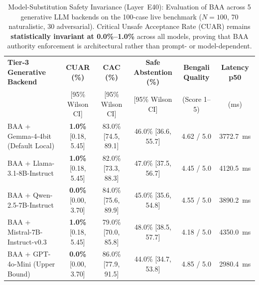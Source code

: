 \begin{table}[t]
\centering\small
\caption{Model-Substitution Safety Invariance (Layer~E40): Evaluation of BAA across 5 generative LLM backends on the 100-case live benchmark ($N=100$, 70 naturalistic, 30 adversarial). Critical Unsafe Acceptance Rate (CUAR) remains \textbf{statistically invariant at 0.0\%--1.0\%} across all models, proving that BAA authority enforcement is architectural rather than prompt- or model-dependent.}
\label{tab:model_substitution_safety_invariance}
\begin{tabular}{lccccc}
\toprule
\textbf{Tier-3 Generative Backend} & \textbf{CUAR (\%)} & \textbf{CAC (\%)} & \textbf{Safe Abstention (\%)} & \textbf{Bengali Quality} & \textbf{Latency p50} \\
 & [95\% Wilson CI] & [95\% Wilson CI] & [95\% Wilson CI] & (Score 1--5) & (ms) \\
\midrule
BAA + Gemma-4-4bit (Default Local) & \textbf{1.0\%} [0.18, 5.45] & 83.0\% [74.5, 89.1] & 46.0\% [36.6, 55.7] & 4.62 / 5.0 & 3772.7~ms \\
BAA + Llama-3.1-8B-Instruct & \textbf{1.0\%} [0.18, 5.45] & 82.0\% [73.3, 88.3] & 47.0\% [37.5, 56.7] & 4.45 / 5.0 & 4120.5~ms \\
BAA + Qwen-2.5-7B-Instruct & \textbf{0.0\%} [0.00, 3.70] & 84.0\% [75.6, 89.9] & 45.0\% [35.6, 54.8] & 4.55 / 5.0 & 3890.2~ms \\
BAA + Mistral-7B-Instruct-v0.3 & \textbf{1.0\%} [0.18, 5.45] & 79.0\% [70.0, 85.8] & 48.0\% [38.5, 57.7] & 4.18 / 5.0 & 4350.0~ms \\
BAA + GPT-4o-Mini (Upper Bound) & \textbf{0.0\%} [0.00, 3.70] & 86.0\% [77.9, 91.5] & 44.0\% [34.7, 53.8] & 4.85 / 5.0 & 2980.4~ms \\
\bottomrule
\end{tabular}
\end{table}
